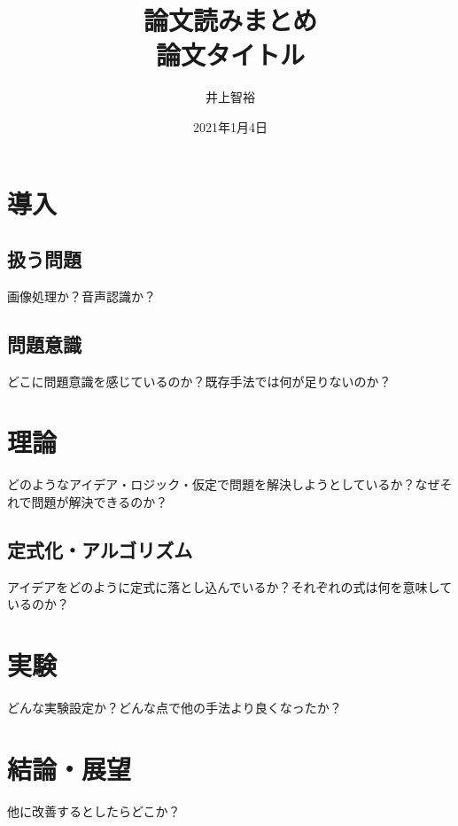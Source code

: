 \documentclass{jsarticle}
\title{\vspace{-3cm}論文読みまとめ\\論文タイトル}
\author{井上智裕}
\date{2021年1月4日}
\begin{document}
\maketitle
\vspace{-1cm}
\section{導入}
\subsection{扱う問題}
画像処理か？音声認識か？
\subsection{問題意識}
どこに問題意識を感じているのか？既存手法では何が足りないのか？

\section{理論}
どのようなアイデア・ロジック・仮定で問題を解決しようとしているか？なぜそれで問題が解決できるのか？
\subsection{定式化・アルゴリズム}
アイデアをどのように定式に落とし込んでいるか？それぞれの式は何を意味しているのか？

\section{実験}
どんな実験設定か？どんな点で他の手法より良くなったか？

\section{結論・展望}
他に改善するとしたらどこか？

\end{document}
